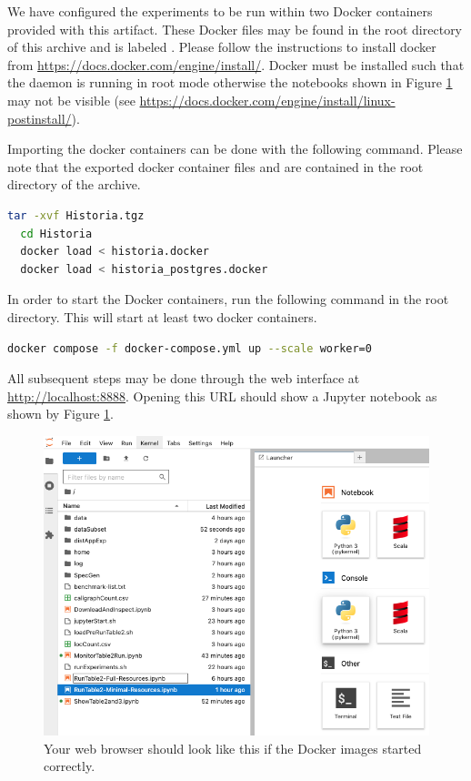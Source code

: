 \documentclass{article} %
\begin{document}
We have configured the experiments to be run within two Docker containers provided with this artifact.
These Docker files may be found in the root directory of this archive and is labeled .  Please follow the instructions to install docker from \url{https://docs.docker.com/engine/install/}.  Docker must be installed such that the daemon is running in root mode otherwise the notebooks shown in Figure \ref{fig:jupyter} may not be visible (see \url{https://docs.docker.com/engine/install/linux-postinstall/}).

Importing the docker containers can be done with the following command. Please note that the exported docker container files  and  are contained in the root directory of the archive.

\begin{lstlisting}[language=bash]
  tar -xvf Historia.tgz
  cd Historia
  docker load < historia.docker
  docker load < historia_postgres.docker
\end{lstlisting}

In order to start the Docker containers, run the following command in the root directory.  This will start at least two docker containers.%

\begin{lstlisting}[language=bash]
 docker compose -f docker-compose.yml up --scale worker=0
\end{lstlisting}

All subsequent steps may be done through the web interface at \url{http://localhost:8888}.  Opening this URL should show a Jupyter notebook as shown by Figure \ref{fig:jupyter}.  

\begin{figure}[h]
    \includegraphics*[scale=0.35]{jupyter.png}
    \caption{Your web browser should look like this if the Docker images started correctly.}
    \label{fig:jupyter}
\end{figure}
\end{document}
